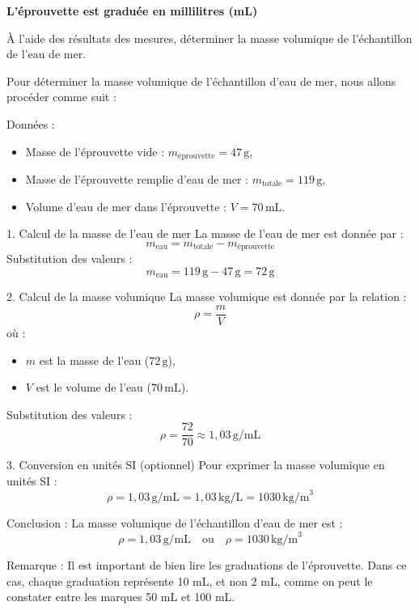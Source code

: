 \documentclass[answers]{exam}
\begin{document}
\textbf{L'éprouvette est graduée en millilitres (mL)}

\begin{questions}
  \question[2] À l'aide des résultats des mesures, déterminer la masse volumique de l'échantillon de l'eau de mer.
\end{questions}

\begin{solution}
  Pour déterminer la masse volumique de l'échantillon d'eau de mer, nous allons procéder comme suit :
  
  Données :
  \begin{itemize}[noitemsep]
    \item Masse de l'éprouvette vide : \( m_{\text{éprouvette}} = 47 \, \text{g} \),
    \item Masse de l'éprouvette remplie d'eau de mer : \( m_{\text{totale}} = 119 \, \text{g} \),
    \item Volume d'eau de mer dans l'éprouvette : \( V = 70 \, \text{mL} \).
  \end{itemize}
  
  1. Calcul de la masse de l'eau de mer
  La masse de l'eau de mer est donnée par :
  \[
  m_{\text{eau}} = m_{\text{totale}} - m_{\text{éprouvette}}
  \]
  Substitution des valeurs :
  \[
  m_{\text{eau}} = 119 \, \text{g} - 47 \, \text{g} = 72 \, \text{g}
  \]
  
  2. Calcul de la masse volumique 
  La masse volumique est donnée par la relation :
  \[
  \rho = \frac{m}{V}
  \]
  où :
  \begin{itemize}[noitemsep]
    \item \( m \) est la masse de l'eau (\( 72 \, \text{g} \)),
    \item \( V \) est le volume de l'eau (\( 70 \, \text{mL} \)).
  \end{itemize}
  
  Substitution des valeurs :
  \[
  \rho = \frac{72}{70} \approx 1,03 \, \text{g/mL}
  \]
  
  3. Conversion en unités SI (optionnel)
  Pour exprimer la masse volumique en unités SI :
  \[
  \rho = 1,03 \, \text{g/mL} = 1,03 \, \text{kg/L} = 1030 \, \text{kg/m}^3
  \]
  
  Conclusion :
  La masse volumique de l'échantillon d'eau de mer est :
  \[
  \rho = 1,03 \, \text{g/mL} \quad \text{ou} \quad \rho = 1030 \, \text{kg/m}^3
  \]
  
  Remarque :
  Il est important de bien lire les graduations de l'éprouvette. Dans ce cas, chaque graduation représente 10 mL, et non 2 mL, comme on peut le constater entre les marques 50 mL et 100 mL.
  \end{solution}
\end{document}
